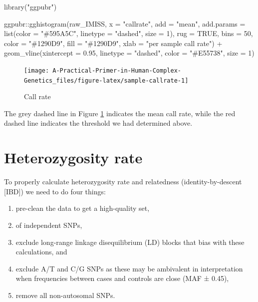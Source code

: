 \documentclass[
]{book}
\newenvironment{Shaded}{\begin{snugshade}}{\end{snugshade}}
\newcommand{\AttributeTok}[1]{\textcolor[rgb]{0.77,0.63,0.00}{#1}}
\newcommand{\ConstantTok}[1]{\textcolor[rgb]{0.00,0.00,0.00}{#1}}
\newcommand{\DecValTok}[1]{\textcolor[rgb]{0.00,0.00,0.81}{#1}}
\newcommand{\FloatTok}[1]{\textcolor[rgb]{0.00,0.00,0.81}{#1}}
\newcommand{\FunctionTok}[1]{\textcolor[rgb]{0.00,0.00,0.00}{#1}}
\newcommand{\NormalTok}[1]{#1}
\newcommand{\SpecialCharTok}[1]{\textcolor[rgb]{0.00,0.00,0.00}{#1}}
\newcommand{\StringTok}[1]{\textcolor[rgb]{0.31,0.60,0.02}{#1}}
\providecommand{\tightlist}{%
  \setlength{\itemsep}{0pt}\setlength{\parskip}{0pt}}
\begin{document}
\begin{Shaded}
\begin{Highlighting}[]
\FunctionTok{library}\NormalTok{(}\StringTok{"ggpubr"}\NormalTok{)}

\NormalTok{ggpubr}\SpecialCharTok{::}\FunctionTok{gghistogram}\NormalTok{(raw\_IMISS, }\AttributeTok{x =} \StringTok{"callrate"}\NormalTok{,}
                    \AttributeTok{add =} \StringTok{"mean"}\NormalTok{, }\AttributeTok{add.params =} \FunctionTok{list}\NormalTok{(}\AttributeTok{color =} \StringTok{"\#595A5C"}\NormalTok{, }\AttributeTok{linetype =} \StringTok{"dashed"}\NormalTok{, }\AttributeTok{size =} \DecValTok{1}\NormalTok{),}
                    \AttributeTok{rug =} \ConstantTok{TRUE}\NormalTok{, }\AttributeTok{bins =} \DecValTok{50}\NormalTok{,}
                    \AttributeTok{color =} \StringTok{"\#1290D9"}\NormalTok{, }\AttributeTok{fill =} \StringTok{"\#1290D9"}\NormalTok{,}
                    \AttributeTok{xlab =} \StringTok{"per sample call rate"}\NormalTok{) }\SpecialCharTok{+}
  \FunctionTok{geom\_vline}\NormalTok{(}\AttributeTok{xintercept =} \FloatTok{0.95}\NormalTok{, }\AttributeTok{linetype =} \StringTok{"dashed"}\NormalTok{,}
                \AttributeTok{color =} \StringTok{"\#E55738"}\NormalTok{, }\AttributeTok{size =} \DecValTok{1}\NormalTok{)}
\end{Highlighting}
\end{Shaded}

\begin{figure}

{\centering \texttt{[image: A-Practical-Primer-in-Human-Complex-Genetics\_files/figure-latex/sample-callrate-1]} 

}

\caption{Call rate}\label{fig:sample-callrate}
\end{figure}

The grey dashed line in Figure \ref{fig:sample-callrate} indicates the mean call rate, while the red dashed line indicates the threshold we had determined above.

\hypertarget{heterozygosity-rate}{%
\section{Heterozygosity rate}\label{heterozygosity-rate}}

To properly calculate heterozygosity rate and relatedness (identity-by-descent {[}IBD{]}) we need to do four things:

\begin{enumerate}
\def\labelenumi{\arabic{enumi})}
\tightlist
\item
  pre-clean the data to get a high-quality set,
\item
  of independent SNPs,
\item
  exclude long-range linkage disequilibrium (LD) blocks that bias with these calculations, and
\item
  exclude A/T and C/G SNPs as these may be ambivalent in interpretation when frequencies between cases and controls are close (MAF ± 0.45),
\item
  remove all non-autosomal SNPs.
\end{enumerate}
\end{document}
